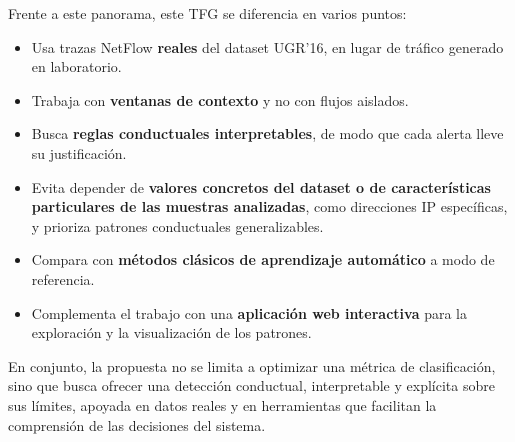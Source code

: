 Frente a este panorama, este TFG se diferencia en varios puntos:

\begin{itemize}
  \item Usa trazas NetFlow \textbf{reales} del dataset UGR'16, en lugar de tráfico generado en laboratorio.
  \item Trabaja con \textbf{ventanas de contexto} y no con flujos aislados.
  \item Busca \textbf{reglas conductuales interpretables}, de modo que cada alerta lleve su justificación.
\item Evita depender de \textbf{valores concretos del dataset o de características particulares de las muestras analizadas}, como direcciones IP específicas, y prioriza patrones conductuales generalizables.
  \item Compara con \textbf{métodos clásicos de aprendizaje automático} a modo de referencia.
  \item Complementa el trabajo con una \textbf{aplicación web interactiva} para la exploración y la visualización de los patrones.
\end{itemize}

En conjunto, la propuesta no se limita a optimizar una métrica de clasificación, sino que busca ofrecer una detección conductual, interpretable y explícita sobre sus límites, apoyada en datos reales y en herramientas que facilitan la comprensión de las decisiones del sistema.
